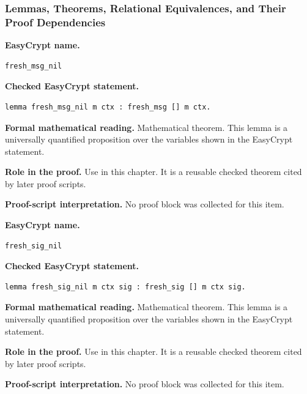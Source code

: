 \subsubsection*{Lemmas, Theorems, Relational Equivalences, and Their Proof Dependencies}
\begin{formaltheorem}
\noindent\textbf{EasyCrypt name.}
\begin{lstlisting}[language=EasyCrypt,basicstyle=\ttfamily\scriptsize]
fresh_msg_nil
\end{lstlisting}
\noindent\textbf{Checked EasyCrypt statement.}
\begin{lstlisting}[language=EasyCrypt,basicstyle=\ttfamily\scriptsize]
lemma fresh_msg_nil m ctx : fresh_msg [] m ctx.
\end{lstlisting}
\noindent\textbf{Formal mathematical reading.}
Mathematical theorem. This lemma is a universally quantified proposition over the variables shown in the EasyCrypt statement.

\noindent\textbf{Role in the proof.}
Use in this chapter. It is a reusable checked theorem cited by later proof scripts.

\noindent\textbf{Proof-script interpretation.}
No proof block was collected for this item.

\end{formaltheorem}

\begin{formaltheorem}
\noindent\textbf{EasyCrypt name.}
\begin{lstlisting}[language=EasyCrypt,basicstyle=\ttfamily\scriptsize]
fresh_sig_nil
\end{lstlisting}
\noindent\textbf{Checked EasyCrypt statement.}
\begin{lstlisting}[language=EasyCrypt,basicstyle=\ttfamily\scriptsize]
lemma fresh_sig_nil m ctx sig : fresh_sig [] m ctx sig.
\end{lstlisting}
\noindent\textbf{Formal mathematical reading.}
Mathematical theorem. This lemma is a universally quantified proposition over the variables shown in the EasyCrypt statement.

\noindent\textbf{Role in the proof.}
Use in this chapter. It is a reusable checked theorem cited by later proof scripts.

\noindent\textbf{Proof-script interpretation.}
No proof block was collected for this item.

\end{formaltheorem}

